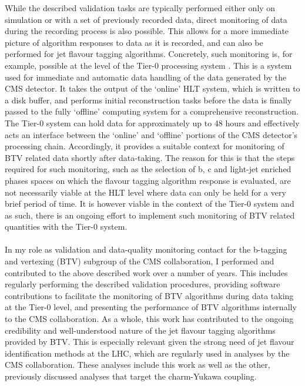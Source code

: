 While the described validation tasks are typically performed either only on simulation or with a set of previously recorded data, direct monitoring of data during the recording process is also possible. This allows for a more immediate picture of algorithm responses to data as it is recorded, and can also be performed for jet flavour tagging algorithms. Concretely, such monitoring is, for example, possible at the level of the Tier-0 processing system \cite{Tier-0CMS}. This is a system used for immediate and automatic data handling of the data generated by the CMS detector. It takes the output of the `online' HLT system, which is written to a disk buffer, and performs initial reconstruction tasks before the data is finally passed to the fully `offline' computing system for a comprehensive reconstruction. The Tier-0 system can hold data for approximately up to 48 hours and effectively acts an interface between the `online' and `offline' portions of the CMS detector's processing chain. Accordingly, it provides a suitable context for monitoring of BTV related data shortly after data-taking. The reason for this is that the steps required for such monitoring, such as the selection of b, c and light-jet enriched phases spaces on which the flavour tagging algorithm response is evaluated, are not necessarily viable at the HLT level where data can only be held for a very brief period of time. It is however viable in the context of the Tier-0 system and as such, there is an ongoing effort to implement such monitoring of BTV related quantities with the Tier-0 system. \\
\\
In my role as validation and data-quality monitoring contact for the b-tagging and vertexing (BTV) subgroup of the CMS collaboration, I performed and contributed to the above described work over a number of years. This includes regularly performing the described validation procedures, providing software contributions to facilitate the monitoring of BTV algorithms during data taking at the Tier-0 level, and presenting the performance of BTV algorithms internally to the CMS collaboration. As a whole, this work has contributed to the ongoing credibility and well-understood nature of the jet flavour tagging algorithms provided by BTV. This is especially relevant given the strong need of jet flavour identification methods at the LHC, which are regularly used in analyses by the CMS collaboration. These analyses include this work as well as the other, previously discussed analyses that target the charm-Yukawa coupling.
